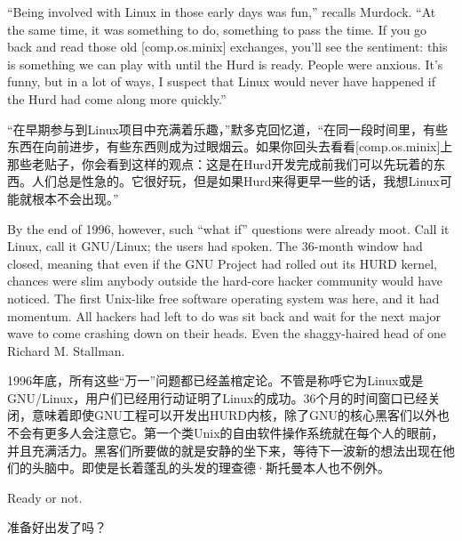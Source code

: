 \ifdefined\eng
``Being involved with Linux in those early days was fun,'' recalls Murdock. ``At the same time, it was something to do, something to pass the time. If you go back and read those old [comp.os.minix] exchanges, you'll see the sentiment: this is something we can play with until the Hurd is ready. People were anxious. It's funny, but in a lot of ways, I suspect that Linux would never have happened if the Hurd had come along more quickly.''
\fi

\ifdefined\chs
``在早期参与到Linux项目中充满着乐趣，''默多克回忆道，``在同一段时间里，有些东西在向前进步，有些东西则成为过眼烟云。如果你回头去看看[comp.os.minix]上那些老贴子，你会看到这样的观点：这是在Hurd开发完成前我们可以先玩着的东西。人们总是性急的。它很好玩，但是如果Hurd来得更早一些的话，我想Linux可能就根本不会出现。''
\fi

\ifdefined\eng
By the end of 1996, however, such ``what if'' questions were already moot. Call it Linux, call it GNU/Linux; the users had spoken. The 36-month window had closed, meaning that even if the GNU Project had rolled out its HURD kernel, chances were slim anybody outside the hard-core hacker community would have noticed. The first Unix-like free software operating system was here, and it had momentum. All hackers had left to do was sit back and wait for the next major wave to come crashing down on their heads. Even the shaggy-haired head of one Richard M. Stallman.
\fi

\ifdefined\chs
1996年底，所有这些``万一''问题都已经盖棺定论。不管是称呼它为Linux或是GNU/Linux，用户们已经用行动证明了Linux的成功。36个月的时间窗口已经关闭，意味着即使GNU工程可以开发出HURD内核，除了GNU的核心黑客们以外也不会有更多人会注意它。第一个类Unix的自由软件操作系统就在每个人的眼前，并且充满活力。黑客们所要做的就是安静的坐下来，等待下一波新的想法出现在他们的头脑中。即使是长着蓬乱的头发的理查德·斯托曼本人也不例外。
\fi

\ifdefined\eng
Ready or not.
\fi

\ifdefined\chs
准备好出发了吗？
\fi

\theendnotes
\setcounter{endnote}{0}

